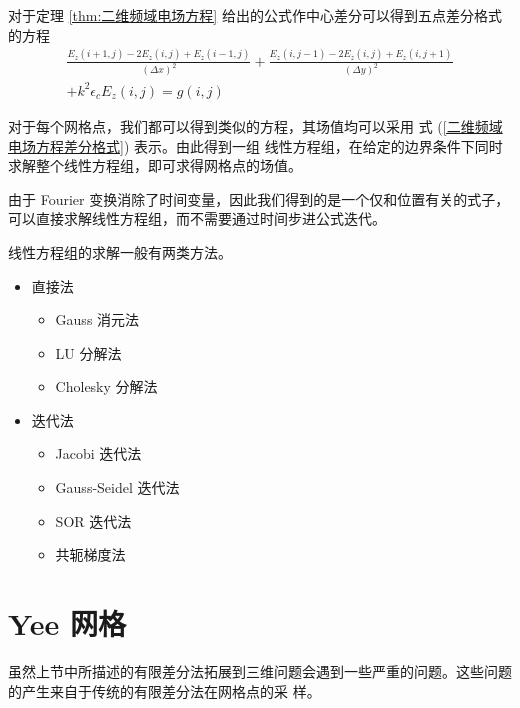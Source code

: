 \begin{theorem}
    对于定理 \ref{thm:二维频域电场方程} 给出的公式作中心差分可以得到五点差分格式的方程
    \begin{equation}
        \begin{gathered}
            \frac{E_z(i+1,j)-2E_z(i,j)+E_z(i-1,j)}{(\Delta x)^2}
            +\frac{E_z(i,j-1)-2E_z(i,j)+E_z(i,j+1)}{(\Delta y)^2}\\
            +k^2\epsilon_c E_z(i,j)
            =g(i,j)
        \end{gathered}
        \label{二维频域电场方程差分格式}
    \end{equation}
\end{theorem}

\par 对于每个网格点，我们都可以得到类似的方程，其场值均可以采用
式 (\ref{二维频域电场方程差分格式}) 表示。由此得到一组
线性方程组，在给定的边界条件下同时求解整个线性方程组，即可求得网格点的场值。

\begin{note}
    由于 Fourier 变换消除了时间变量，因此我们得到的是一个仅和位置有关的式子，
    可以直接求解线性方程组，而不需要通过时间步进公式迭代。
\end{note}

\par 线性方程组的求解一般有两类方法。
\begin{itemize}
    \item 直接法
    \begin{itemize}
        \item Gauss 消元法
        \item LU 分解法
        \item Cholesky 分解法
    \end{itemize}
    \item 迭代法
    \begin{itemize}
        \item Jacobi 迭代法
        \item Gauss-Seidel 迭代法
        \item SOR 迭代法
        \item 共轭梯度法
    \end{itemize}
\end{itemize}

\section{Yee 网格}

\par 虽然上节中所描述的有限差分法拓展到三维问题会遇到一些严重的问题。这些问题的产生来自于传统的有限差分法在网格点的采
样。

